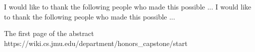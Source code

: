 \documentclass[12 pt]{report}
\begin{document}
\noindent I would like to thank the following people who made this possible ...
I would like to thank the following people who made this possible ...


\tableofcontents

\listoftables

\listoffigures


\acknowledgementspage

\abstractpage

The first page of the abstract https://wiki.cs.jmu.edu/department/honors_capstone/start

%
%
%
%
\startofchapters


%
%
%

\appendix
\appendixeqnumbering









\end{document}
